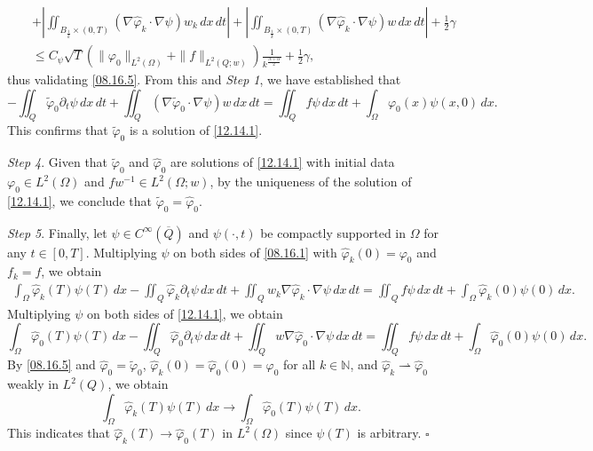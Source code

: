 \documentclass[11pt]{article}
\newenvironment{proof}{{\bf {Proof.}}}{\hfill $\square$}
\numberwithin{equation}{section}
\def\bf{\textbf}
\begin{document}
\begin{proof}
\begin{eqnarray*}
&&  + \left|\iint_{B_{\frac{1}{k}} \times (0,T)} (\nabla\widehat{\varphi}_k \cdot \nabla\psi) w_k \, dx \, dt\right| + \left|\iint_{B_{\frac{1}{k}} \times (0,T)} (\nabla\widehat{\varphi}_k \cdot \nabla\psi) w \, dx \, dt\right| + \frac{1}{2}\gamma \\
&&\leq C_\psi \sqrt{T} \left(\|\varphi_0\|_{L^2(\Omega)} + \|f\|_{L^2(Q; w)}\right) \frac{1}{k^{\frac{N+\alpha}{2}}} + \frac{1}{2}\gamma,
\end{eqnarray*}
thus validating \eqref{08.16.5}. From this and {\it Step 1}, we have established that
\begin{equation*}
-\iint_Q \widetilde{\varphi}_0 \partial_t \psi \, dx \, dt + \iint_Q (\nabla\widetilde{\varphi}_0 \cdot \nabla\psi) w \, dx \, dt = \iint_Q f \psi \, dx \, dt + \int_\Omega \varphi_0(x) \psi(x,0) \, dx.
\end{equation*}
This confirms that $\widetilde{\varphi}_0$ is a solution of \eqref{12.14.1}.

{\it Step 4}. Given that $\widetilde{\varphi}_0$ and $\widehat{\varphi}_0$ are solutions of \eqref{12.14.1} with initial data $\varphi_0 \in L^2(\Omega)$ and $f w^{-1} \in L^2(\Omega; w)$, by the uniqueness of the solution of \eqref{12.14.1}, we conclude that $\widetilde{\varphi}_0 = \widehat{\varphi}_0$.

{\it Step 5}. Finally, let $\psi \in C^\infty(\overline{Q})$ and $\psi(\cdot, t)$ be compactly supported in $\Omega$ for any $t \in [0,T]$. Multiplying $\psi$ on both sides of \eqref{08.16.1} with $\widehat{\varphi}_k(0) = \varphi_0$ and $f_k = f$, we obtain
\begin{equation*}
\begin{split}
\int_\Omega \widehat{\varphi}_k(T) \psi(T) \, dx - \iint_Q \widehat{\varphi}_k \partial_t \psi \, dx \, dt + \iint_Q w_k \nabla \widehat{\varphi}_k \cdot \nabla\psi \, dx \, dt = \iint_Q f \psi \, dx \, dt + \int_\Omega \widehat{\varphi}_k(0) \psi(0) \, dx.
\end{split}
\end{equation*}
Multiplying $\psi$ on both sides of \eqref{12.14.1}, we obtain
\begin{equation*}
\int_\Omega \widehat{\varphi}_0(T) \psi(T) \, dx - \iint_Q \widehat{\varphi}_0 \partial_t \psi \, dx \, dt + \iint_Q w \nabla \widehat{\varphi}_0 \cdot \nabla\psi \, dx \, dt = \iint_Q f \psi \, dx \, dt + \int_\Omega \widehat{\varphi}_0(0) \psi(0) \, dx.
\end{equation*}
By \eqref{08.16.5} and $\widehat{\varphi}_0 = \widetilde{\varphi}_0$, $\widehat{\varphi}_k(0) = \widehat{\varphi}_0(0) = \varphi_0$ for all $k \in \mathbb{N}$, and $\widehat{\varphi}_k \rightharpoonup \widehat{\varphi}_0$ weakly in $L^2(Q)$, we obtain
\begin{equation*}
\int_\Omega \widehat{\varphi}_k(T) \psi(T) \, dx \to \int_\Omega \widehat{\varphi}_0(T) \psi(T) \, dx.
\end{equation*}
This indicates that $\widehat{\varphi}_k(T) \to \widehat{\varphi}_0(T)$ in $L^2(\Omega)$ since $\psi(T)$ is arbitrary.
\end{proof}
\end{document}
